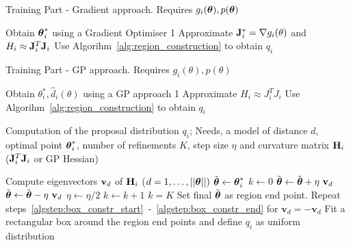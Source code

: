 \begin{minipage}{0.46\textwidth}
\begin{algorithm}[H]
    \centering
    \caption{Training Part - Gradient approach. Requires $g_i(\boldsymbol{\theta}), p(\boldsymbol{\theta})$}\label{alg:training_GB}
    \begin{algorithmic}[1]
        \State Obtain $\boldsymbol{\theta}_i^*$ using a Gradient Optimiser
         1
        \Else
        \State Approximate $\mathbf{J}_i^* = \nabla g_i(\theta)$ and $H_i \approx \mathbf{J}^T_i\mathbf{J}_i$
        \State Use Algorihm~\ref{alg:region_construction} to obtain $q_i$
        \EndIf      
      \EndFor
    \end{algorithmic}
\end{algorithm}
\end{minipage}
\hfill
\begin{minipage}{0.46\textwidth}
\begin{algorithm}[H]
    \centering
    \caption{Training Part - GP approach. Requires $g_i(\theta), p(\theta)$}\label{alg:training_GP}
    \begin{algorithmic}[1]
        \State Obtain $\theta_i^*, \hat{d}_i(\theta)$ using a GP approach
         1
        \Else
        \State Approximate $H_i \approx J^T_iJ_i$
        \State Use Algorihm~\ref{alg:region_construction} to obtain $q_i$
        \EndIf      
      \EndFor
    \end{algorithmic}
\end{algorithm}
\end{minipage}

\begin{algorithm}[!ht]
	\caption{Computation of the proposal distribution $q_i$; Needs, a model of distance $d$, optimal point $\boldsymbol{\theta}_i^*$, number of refinements $K$, step size $\eta$ and curvature matrix $\mathbf{H}_i$ ($\mathbf{J}_i^T\mathbf{J}_i $ or GP Hessian)}\label{alg:region_construction}
	\begin{algorithmic}[1]
	\State Compute eigenvectors $\mathbf{v}_{d}$ of $\mathbf{H}_i$ {\scriptsize ($d = 1,\ldots,||\boldsymbol{\theta} ||)$}
		\State $\Tilde{\boldsymbol{\theta}} \gets \boldsymbol{\theta}_i^*$ \label{algstep:box_constr_start}
		\State $k \gets 0$
		\Repeat
        	\Repeat
                \State $\Tilde{\boldsymbol{\theta}} \gets \Tilde{\boldsymbol{\theta}} + \eta \ \mathbf{v}_{d}$ 
        	\State $\Tilde{\boldsymbol{\theta}} \gets \Tilde{\boldsymbol{\theta}} - \eta \ \mathbf{v}_{d}$
        	\State $\eta \gets \eta/2$ 
        	\State $k \gets k + 1$
    	\Until $k = K$
    	\State Set final $\Tilde{\boldsymbol{\theta}}$ as region end point. \label{algstep:box_constr_end}
    	\State Repeat steps~\ref{algstep:box_constr_start}~-~\ref{algstep:box_constr_end} for $\mathbf{v}_{d} = - \mathbf{v}_{d}$
	\EndFor
	\State Fit a rectangular box around the region end points and define $q_i$ as uniform distribution
	\end{algorithmic}
\end{algorithm}

